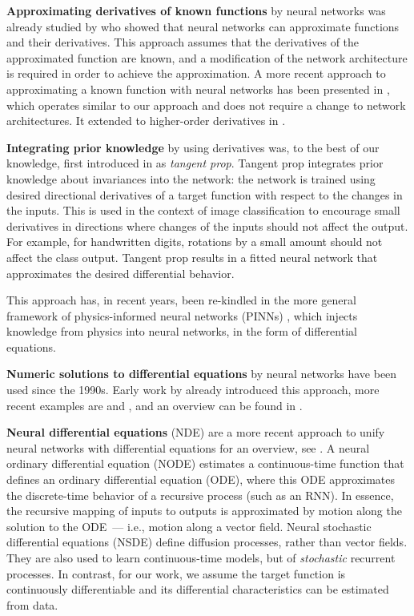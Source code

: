 \documentclass[conference]{IEEEtran}
\begin{document}
\textbf{Approximating derivatives of known functions} by neural networks 
was already studied by \cite{hornik-et-al-1990-universal} who showed that neural networks can approximate functions and their derivatives. 
This approach assumes that the derivatives of the approximated function are known, and a modification of the network architecture is required in order to achieve the approximation. 
A more recent approach to approximating a known function with neural networks has been presented in \cite{Avrutskiy2017}, which operates similar to our approach and does not require a change to network architectures. 
It extended to higher-order derivatives in 
\cite{Avrutskiy2021}. 

\textbf{Integrating prior knowledge} by using derivatives was, to the best of our knowledge, first introduced in
\cite{LeCun91} as \emph{tangent prop}. 
Tangent prop integrates prior knowledge about invariances into the network: the network is trained using desired directional derivatives of a target function with respect to the changes in the inputs. 
This is used in the context of image classification to encourage small derivatives in directions where changes of the inputs should not affect the output. 
For example, for handwritten digits, rotations by a small amount should not affect the class output. 
Tangent prop results in a fitted neural network that approximates the desired differential behavior. 

This approach has, in recent years, been re-kindled in the more general framework of physics-informed neural networks (PINNs) \cite{raissi2019physics,cuomo2022scientific}, which injects knowledge from physics into neural networks, in the form of differential equations. 

\textbf{Numeric solutions to differential equations} by neural networks have been used since the 1990s. 
Early work by \cite{lee1990neural} already introduced this approach, more recent examples are \cite{parisi2003solving} and \cite{malek2006numerical}, and an overview can be found in \cite{beck2023overview}.

\textbf{Neural differential equations} (NDE) are a more recent approach to unify neural networks with differential equations for an overview, see \cite{Kidger22}.
A neural ordinary differential equation (NODE) \cite{NEURIPS2018_Chen} estimates a continuous-time function that defines an ordinary differential equation (ODE), where this ODE approximates the discrete-time behavior of a recursive process (such as an RNN). In essence, the recursive mapping of inputs to outputs is approximated by motion along the solution to the ODE~--- i.e., motion along a vector field.
Neural stochastic differential equations (NSDE) \cite{tzen2019neural} define diffusion processes, rather than vector fields. 
They are also used to learn continuous-time models, but of \textit{stochastic} recurrent processes. 
In contrast, for our work, we assume the target function is continuously differentiable and its differential characteristics can be estimated from data. 
\end{document}
